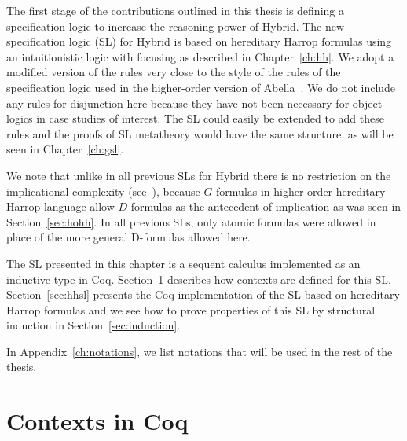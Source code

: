 

The first stage of the contributions outlined in this thesis is defining a specification logic to increase the reasoning power of Hybrid. The new specification logic (SL) for Hybrid is based on hereditary Harrop formulas using an intuitionistic logic with focusing as described in Chapter~\ref{ch:hh}. We adopt a modified version of the rules very close to the style of the rules of the specification logic used in the higher-order version of Abella~\cite{WCGN:PPDP13}. We do not include any rules for disjunction here because they have not been necessary for object logics in case studies of interest. The SL could easily be extended to add these rules and the proofs of SL metatheory would have the same structure, as will be seen in Chapter~\ref{ch:gsl}.

We note that unlike in all previous SLs for Hybrid there is no restriction on the implicational complexity (see~\cite{FeltyMomigliano:JAR10}), because $G$-formulas in higher-order hereditary Harrop language allow $D$-formulas as the antecedent of implication as was seen in Section~\ref{sec:hohh}. In all previous SLs, only atomic formulas were allowed in place of the more general D-formulas allowed here.
%

The SL presented in this chapter is a sequent calculus implemented as an inductive type in Coq. Section~\ref{sec:context} describes how contexts are defined for this SL. Section~\ref{sec:hhsl} presents the Coq implementation of the SL based on hereditary Harrop formulas and we see how to prove properties of this SL by structural induction in Section~\ref{sec:induction}.

In Appendix~\ref{ch:notations}, we list notations that will be used in the rest of the thesis.

\section{Contexts in Coq}
\label{sec:context}

